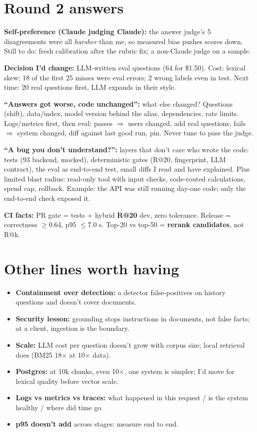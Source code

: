\documentclass[10pt,a4paper]{article}
\begin{document}
\section{Round 2 answers}
\textbf{Self-preference (Claude judging Claude):} the answer judge's 5 disagreements were all \emph{harsher} than me, so
measured bias pushes scores down. Still to do: fresh calibration after the rubric fix; a non-Claude judge on a sample.

\textbf{Decision I'd change:} LLM-written eval questions (64 for \$1.50). Cost: lexical skew; 18 of the first 25 misses
were eval errors; 2 wrong labels even in test. Next time: 20 real questions first, LLM expands in their style.

\textbf{``Answers got worse, code unchanged'':} what else changed? Questions (shift), data/index, model version behind
the alias, dependencies, rate limits. Logs/metrics first, then eval: passes $\Rightarrow$ users changed, add real
questions; fails $\Rightarrow$ system changed, diff against last good run, pin. Never tune to pass the judge.

\textbf{``A bug you don't understand?'':} layers that don't care who wrote the code: tests (93 backend, mocked), deterministic
gates (R@20, fingerprint, LLM contract), the eval as end-to-end test, small diffs I read and have explained. Plus limited
blast radius: read-only tool with input checks, code-routed calculations, spend cap, rollback. Example: the API was still
running day-one code; only the end-to-end check exposed it.

\textbf{CI facts:} PR gate = tests + hybrid \textbf{R@20} dev, zero tolerance. Release = correctness $\geq$0.64,
p95 $\leq$7.0 s. Top-20 vs top-50 = \textbf{rerank candidates}, not R@k.

\section{Other lines worth having}
\begin{itemize}
\item \textbf{Containment over detection:} a detector false-positives on history questions and doesn't cover documents.
\item \textbf{Security lesson:} grounding stops instructions in documents, not false facts; at a client, ingestion is the boundary.
\item \textbf{Scale:} LLM cost per question doesn't grow with corpus size; local retrieval does (BM25 18$\times$ at 10$\times$ data).
\item \textbf{Postgres:} at 10k chunks, even 10$\times$, one system is simpler; I'd move for lexical quality before vector scale.
\item \textbf{Logs vs metrics vs traces:} what happened in this request / is the system healthy / where did time go.
\item \textbf{p95 doesn't add} across stages: measure end to end.
\end{itemize}
\end{document}
